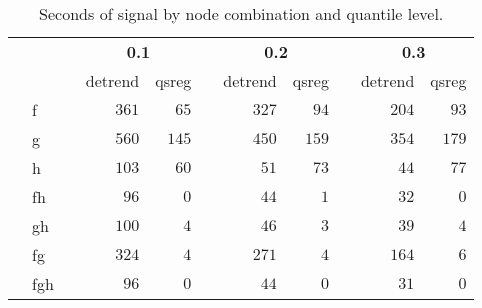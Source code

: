 \begin{table}[!tbp]
\caption{Seconds of signal by node combination and quantile level.\label{}} 
\begin{center}
\begin{tabular}{llcrrcrrcrr}
\hline\hline
\multicolumn{1}{l}{\bfseries }&\multicolumn{1}{c}{\bfseries }&\multicolumn{1}{c}{\bfseries }&\multicolumn{2}{c}{\bfseries 0.1}&\multicolumn{1}{c}{\bfseries }&\multicolumn{2}{c}{\bfseries 0.2}&\multicolumn{1}{c}{\bfseries }&\multicolumn{2}{c}{\bfseries 0.3}\tabularnewline
\cline{4-5} \cline{7-8} \cline{10-11}
\multicolumn{1}{l}{}&\multicolumn{1}{c}{}&\multicolumn{1}{c}{}&\multicolumn{1}{c}{detrend}&\multicolumn{1}{c}{qsreg}&\multicolumn{1}{c}{}&\multicolumn{1}{c}{detrend}&\multicolumn{1}{c}{qsreg}&\multicolumn{1}{c}{}&\multicolumn{1}{c}{detrend}&\multicolumn{1}{c}{qsreg}\tabularnewline
\hline
&f&&$361$&$ 65$&&$327$&$ 94$&&$204$&$ 93$\tabularnewline
&g&&$560$&$145$&&$450$&$159$&&$354$&$179$\tabularnewline
&h&&$103$&$ 60$&&$ 51$&$ 73$&&$ 44$&$ 77$\tabularnewline
&fh&&$ 96$&$  0$&&$ 44$&$  1$&&$ 32$&$  0$\tabularnewline
&gh&&$100$&$  4$&&$ 46$&$  3$&&$ 39$&$  4$\tabularnewline
&fg&&$324$&$  4$&&$271$&$  4$&&$164$&$  6$\tabularnewline
&fgh&&$ 96$&$  0$&&$ 44$&$  0$&&$ 31$&$  0$\tabularnewline
\hline
\end{tabular}\end{center}
\end{table}
